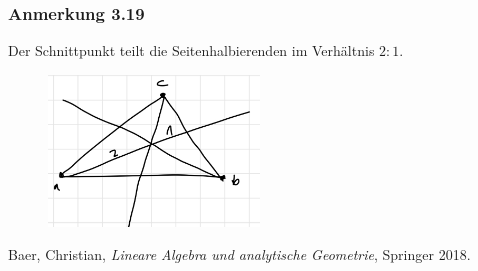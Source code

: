 \documentclass{article}
\begin{document}
\subsubsection*{Anmerkung 3.19}
Der Schnittpunkt teilt die Seitenhalbierenden im Verhältnis $2:1$. \\
\begin{figure}[h]
    \centering
    \includegraphics[width=0.5\textwidth]{Images/3.19.jpeg}
    \caption{}
\end{figure}

\newpage
\begin{thebibliography}{9}
    Baer, Christian,
    \emph{Lineare Algebra und analytische Geometrie},
    Springer 2018.
    \end{thebibliography}
\end{document}
